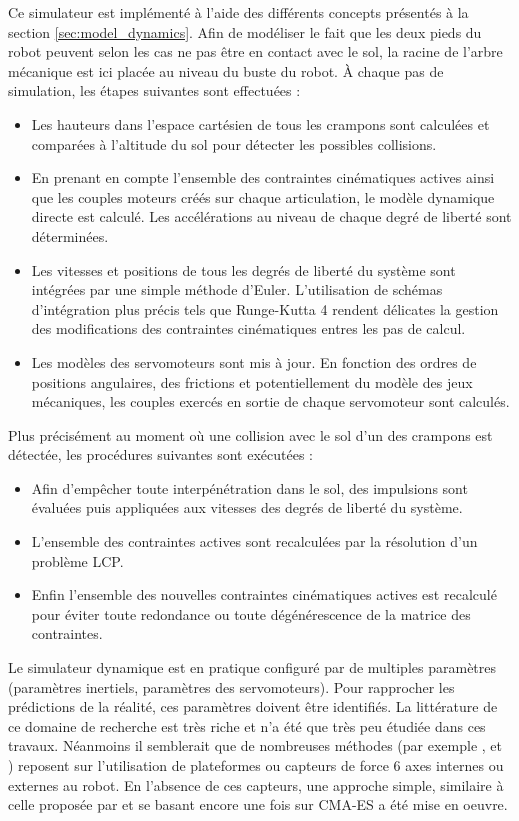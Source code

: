 Ce simulateur est implémenté à l'aide des différents concepts présentés
à la section \ref{sec:model_dynamics}.
Afin de modéliser le fait que les deux pieds du robot peuvent selon
les cas ne pas être en contact avec le sol, la racine
de l'arbre mécanique est ici placée au niveau du buste du robot.
À chaque pas de simulation, les étapes suivantes sont effectuées :
\begin{itemize}
    \item Les hauteurs dans l'espace cartésien de tous les crampons
        sont calculées et comparées à l'altitude du sol pour détecter
        les possibles collisions.
    \item En prenant en compte l'ensemble des contraintes cinématiques actives ainsi
        que les couples moteurs créés sur chaque articulation, le modèle dynamique directe
        est calculé. Les accélérations au niveau de chaque degré de liberté sont déterminées.
    \item Les vitesses et positions de tous les degrés de liberté du système sont
        intégrées par une simple méthode d'Euler. L'utilisation de schémas d'intégration
        plus précis tels que \og Runge-Kutta 4 \fg rendent délicates la gestion 
        des modifications des contraintes cinématiques entres les pas de calcul.
    \item Les modèles des servomoteurs sont mis à jour. En fonction des ordres
        de positions angulaires, des frictions et potentiellement du modèle des 
        jeux mécaniques, les couples exercés en sortie de chaque servomoteur sont calculés.
\end{itemize}
Plus précisément au moment où une collision avec le sol d'un 
des crampons est détectée, les procédures suivantes sont exécutées :
\begin{itemize}
    \item Afin d'empêcher toute interpénétration dans le sol,
        des impulsions sont évaluées puis appliquées aux vitesses des 
        degrés de liberté du système.
    \item L'ensemble des contraintes actives sont recalculées
        par la résolution d'un problème LCP.
    \item Enfin l'ensemble des nouvelles contraintes cinématiques actives 
        est recalculé pour éviter toute redondance ou toute dégénérescence
        de la matrice des contraintes.\\
\end{itemize}

Le simulateur dynamique est en pratique configuré par de multiples
paramètres (paramètres inertiels, paramètres des servomoteurs).
Pour rapprocher les prédictions de la réalité, 
ces paramètres doivent être identifiés.
La littérature de ce domaine de recherche est très riche et n'a été que 
très peu étudiée dans ces travaux. 
Néanmoins il semblerait que de nombreuses méthodes 
(par exemple \cite{venture_dynamics_2008}, \cite{iwasaki_identification_2012} 
et \cite{traversaro_inertial_2013}) reposent sur l'utilisation
de plateformes ou capteurs de force $6$ axes internes ou externes au robot.
En l'absence de ces capteurs, une approche simple, similaire à celle 
proposée par \cite{urbann_rigid_2011} et se basant encore une fois 
sur CMA-ES a été mise en oeuvre.

